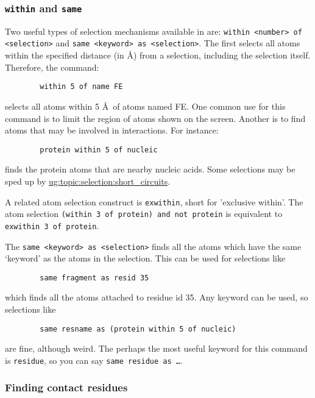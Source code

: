 \subsubsection{{\tt within} and {\tt same}}
Two useful types of selection mechanisms available in \VMD are:
\verb!within <number> of <selection>! 
and \verb!same <keyword> as <selection>!.  The first selects all atoms 
within the specified
distance (in \AA) from a selection, including the selection itself.
Therefore, the command:

\begin{verbatim}
        within 5 of name FE
\end{verbatim}

\noindent selects all atoms within 5 \AA\ of atoms named FE.  One common use for
this command is to limit the region of atoms shown on the screen.
Another is to find atoms that may be involved in interactions.  For
instance:

\begin{verbatim}
        protein within 5 of nucleic
\end{verbatim}

\noindent finds the protein atoms that are nearby nucleic acids.  
Some selections may be sped up
by 
\hyperref{short circuiting}{short circuiting [\S }{]}
         {ug:topic:selection:short_circuits}.

A related atom selection construct is {\tt exwithin}, short for
'exclusive within'.  The atom selection {\tt (within 3 of protein) and not 
protein} is equivalent to {\tt exwithin 3 of protein}. 

  The \verb!same <keyword> as <selection>! finds all the atoms
which have the same `keyword' as the atoms in the selection.  This can
be used for selections like
\begin{verbatim}
        same fragment as resid 35
\end{verbatim}
\noindent which finds all the atoms attached to residue id 35.  Any keyword 
can be used, so selections like
\begin{verbatim}
        same resname as (protein within 5 of nucleic)
\end{verbatim}
\noindent are fine, although weird.  The perhaps the most useful keyword
for this command is {\tt residue}, so you can say {\tt same residue as
\ldots}.

\subsubsection{Finding contact residues}

